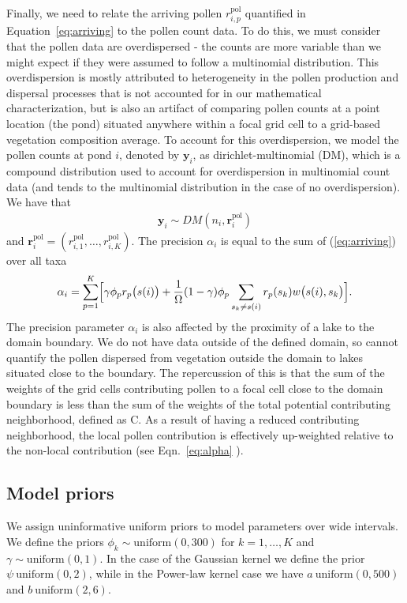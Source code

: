 \documentclass[12pt]{article}
\begin{document}
Finally, we need to relate the arriving pollen $r_{i,p}^{\text{pol}}$
quantified in Equation~\ref{eq:arriving} to the pollen count data. To
do this, we must consider that the pollen data are overdispersed - the
counts are more variable than we might expect if they were assumed to
follow a multinomial distribution. This overdispersion is mostly
attributed to heterogeneity in the pollen production and dispersal
processes that is not accounted for in our mathematical
characterization, but is also an artifact of comparing pollen counts
at a point location (the pond) situated anywhere within a focal grid
cell to a grid-based vegetation composition average. To account for
this overdispersion, we model the pollen counts at pond $i$, denoted
by $\bm{y}_i$, as dirichlet-multinomial (DM), which is a compound
distribution used to account for overdispersion in multinomial count
data (and tends to the multinomial distribution in the case of no
overdispersion). We have that
\begin{align}
\bm{y}_i \sim DM (n_i, \bm{r}_i^{\text{pol}})
\label{eq:DM}
\end{align}
and $\bm{r}_i^{\text{pol}} = (r_{i,1}^{\text{pol}}, \ldots,
r_{i,K}^{\text{pol}})$.  The precision $\alpha_i$ is equal to the sum
of (\ref{eq:arriving}) over all taxa
\begin{align}
\alpha_i = \sum_{p=1}^K \Bigl[\gamma \phi_p r_p\bigl(s(i)\bigr) + \frac{1}{\Omega} (1-\gamma) \phi_p \sum_{s_k \neq s(i) } r_p(s_k) w\bigl(s(i), s_k\bigr)\Bigr].
\label{eq:alpha}
\end{align}
The precision parameter $\alpha_i$ is also affected by the proximity
of a lake to the domain boundary. We do not have data outside of the
defined domain, so cannot quantify the pollen dispersed from
vegetation outside the domain to lakes situated close to the
boundary. The repercussion of this is that the sum of the weights of
the grid cells contributing pollen to a focal cell close to the domain
boundary is less than the sum of the weights of the total potential
contributing neighborhood, defined as C. As a result of having a
reduced contributing neighborhood, the local pollen contribution is
effectively up-weighted relative to the non-local contribution (see
Eqn.~\ref{eq:alpha} ).

\subsection{Model priors}

We assign uninformative uniform priors to model parameters over wide
intervals. We define the priors $\phi_k \sim \text{uniform}(0, 300)$ for
$k=1, \ldots, K$ and $\gamma \sim \text{uniform}(0,1)$. In the case of the
Gaussian kernel we define the prior $\psi ~ \text{uniform}(0, 2)$, while in
the Power-law kernel case we have $a ~ \text{uniform}(0, 500)$ and
$b~\text{uniform}(2, 6)$.
\end{document}
